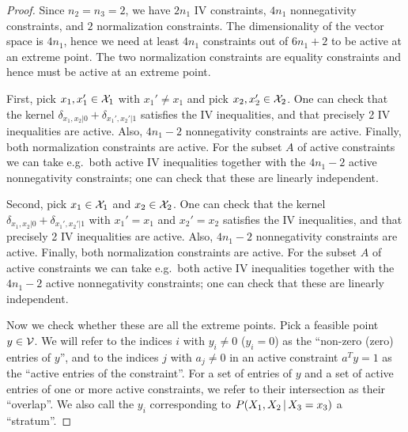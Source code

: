 \begin{proof}
  Since $n_2=n_3=2$, we have $2n_1$ IV constraints, $4n_1$ nonnegativity constraints, and $2$ normalization constraints.
  The dimensionality of the vector space is $4n_1$, hence we need at least $4n_1$ constraints out of $6n_1 + 2$ to be active at an extreme point.
  The two normalization constraints are equality constraints and hence must be active at an extreme point.

  First, pick $x_1,x_1' \in \mathcal{X}_1$ with $x_1' \ne x_1$ and pick $x_2,x_2' \in \mathcal{X}_2$.
  One can check that the kernel $\delta_{x_1,x_2|0} + \delta_{x_1',x_2'|1}$ satisfies the IV inequalities, and that precisely 2 IV inequalities are active.
  Also, $4n_1 - 2$ nonnegativity constraints are active.
  Finally, both normalization constraints are active.
  For the subset $A$ of active constraints we can take e.g.\ both active IV inequalities together with the $4n_1 - 2$ active nonnegativity constraints; one can check that these are linearly independent.

  Second, pick $x_1 \in \mathcal{X}_1$ and $x_2 \in \mathcal{X}_2$. One can check that the kernel $\delta_{x_1,x_2|0} + \delta_{x_1',x_2'|1}$ with $x_1'=x_1$ and $x_2'=x_2$ satisfies the IV inequalities, and that precisely 2 IV inequalities are active.
  Also, $4n_1 - 2$ nonnegativity constraints are active.
  Finally, both normalization constraints are active.
  For the subset $A$ of active constraints we can take e.g.\ both active IV inequalities together with the $4n_1 - 2$ active nonnegativity constraints; one can check that these are linearly independent.

  Now we check whether these are all the extreme points.
  Pick a feasible point $y \in \mathcal{V}$.
  We will refer to the indices $i$ with $y_i \ne 0$ ($y_i = 0$) as the ``non-zero (zero) entries of $y$'', and to the indices $j$ with $a_j \ne 0$ in an active constraint $a^T y = 1$ as the ``active entries of the constraint''. 
  For a set of entries of $y$ and a set of active entries of one or more active constraints, we refer to their intersection as their ``overlap''.
  We also call the $y_i$ corresponding to $P(X_1,X_2\operatorname*{|} X_3=x_3)$ a ``stratum''.


\end{proof}
